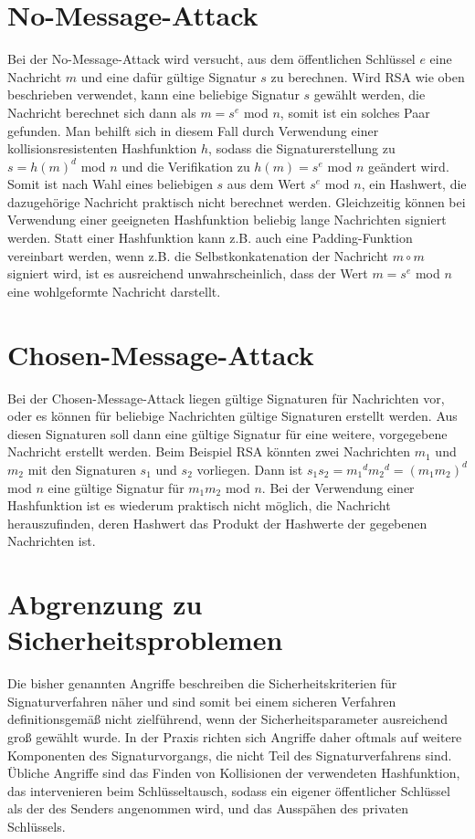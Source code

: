 \documentclass[a4paper,12pt,oneside]{scrreprt}
\begin{document}
\section{No-Message-Attack}

Bei der No-Message-Attack wird versucht, aus dem öffentlichen Schlüssel $e$ eine Nachricht $m$ und eine dafür gültige Signatur $s$ zu berechnen. Wird RSA wie oben beschrieben verwendet, kann eine beliebige Signatur $s$ gewählt werden, die Nachricht berechnet sich dann als $m = s^e$ mod $n$, somit ist ein solches Paar gefunden. Man behilft sich in diesem Fall durch Verwendung einer kollisionsresistenten Hashfunktion $h$, sodass die Signaturerstellung zu $s = h(m)^d$ mod $n$ und die Verifikation zu $h(m) = s^e$ mod $n$ geändert wird. Somit ist nach Wahl eines beliebigen $s$ aus dem Wert $s^e$ mod $n$, ein Hashwert, die dazugehörige Nachricht praktisch nicht berechnet werden. Gleichzeitig können bei Verwendung einer geeigneten Hashfunktion beliebig lange Nachrichten signiert werden. Statt einer Hashfunktion kann z.B. auch eine Padding-Funktion vereinbart werden, wenn z.B. die Selbstkonkatenation der Nachricht $m \circ m$ signiert wird, ist es ausreichend unwahrscheinlich, dass der Wert $m = s^e$ mod $n$ eine wohlgeformte Nachricht darstellt. 

\section{Chosen-Message-Attack}

Bei der Chosen-Message-Attack liegen gültige Signaturen für Nachrichten vor, oder es können für beliebige Nachrichten gültige Signaturen erstellt werden. Aus diesen Signaturen soll dann eine gültige Signatur für eine weitere, vorgegebene Nachricht erstellt werden. Beim Beispiel RSA könnten zwei Nachrichten $m_1$ und $m_2$ mit den Signaturen $s_1$ und $s_2$ vorliegen. Dann ist $s_1 s_2 = {m_1}^d {m_2}^d = (m_1 m_2)^d$ mod $n$ eine gültige Signatur für $m_1 m_2$ mod $n$. Bei der Verwendung einer Hashfunktion ist es wiederum praktisch nicht möglich, die Nachricht herauszufinden, deren Hashwert das Produkt der Hashwerte der gegebenen Nachrichten ist. 

\section{Abgrenzung zu Sicherheitsproblemen}

Die bisher genannten Angriffe beschreiben die Sicherheitskriterien für Signaturverfahren näher und sind somit bei einem sicheren Verfahren definitionsgemäß nicht zielführend, wenn der Sicherheitsparameter ausreichend groß gewählt wurde. In der Praxis richten sich Angriffe daher oftmals auf weitere Komponenten des Signaturvorgangs, die nicht Teil des Signaturverfahrens sind. Übliche Angriffe sind das Finden von Kollisionen der verwendeten Hashfunktion, das intervenieren beim Schlüsseltausch, sodass ein eigener öffentlicher Schlüssel als der des Senders angenommen wird, und das Ausspähen des privaten Schlüssels. 
\end{document}
